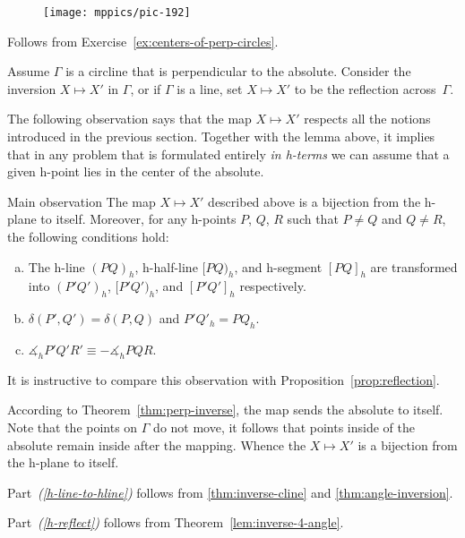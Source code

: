 \begin{figure}
\vskip-4mm
\centering
\texttt{[image: mppics/pic-192]}
\end{figure}

Follows from Exercise~\ref{ex:centers-of-perp-circles}.
\qeds

Assume $\Gamma$ is a circline that is perpendicular to the absolute.
Consider the inversion $X\mapsto X'$
in $\Gamma$, 
or if $\Gamma$ is a line,
set $X\mapsto X'$ to be the reflection across~$\Gamma$.

The following observation says that the map $X\mapsto X'$ respects all the notions introduced in the previous section.
Together with the lemma above, it implies that in any problem that is formulated entirely {}\emph{in h-terms} we can assume that a given h-point lies in the center of the absolute.

\begin{thm}{Main observation}\label{thm:main-observ}
The map $X\mapsto X'$ described above is a bijection from the h-plane to itself. 
Moreover, for any h-points $P$, $Q$, $R$ such that $P\ne Q$ and $Q\ne R$, the following conditions hold:
\begin{enumerate}[(a)]
\item\label{h-line-to-hline} The h-line $(PQ)_h$, h-half-line $[PQ)_h$, and h-segment $[PQ]_h$ are transformed into $(P'Q')_h$, $[P'Q')_h$, and $[P'Q']_h$ respectively.
\item\label{h-reflect} $\delta(P',Q')=\delta(P,Q)$ and $P'Q'_h=PQ_h$.
\item\label{h-angle-mes} 
$\measuredangle_h P'Q'R'\equiv-\measuredangle_h PQR$.
\end{enumerate}

\end{thm}

It is instructive to compare this observation with Proposition~\ref{prop:reflection}.

According to Theorem~\ref{thm:perp-inverse}, the map sends the absolute to itself. 
Note that the points on $\Gamma$ do not move, it follows that points inside of the absolute remain inside after the mapping.
Whence the $X\mapsto X'$ is a bijection from the h-plane to itself.


Part~\textit{(\ref{h-line-to-hline})} follows from \ref{thm:inverse-cline} and \ref{thm:angle-inversion}.

Part~\textit{(\ref{h-reflect})} follows from Theorem~\ref{lem:inverse-4-angle}.

